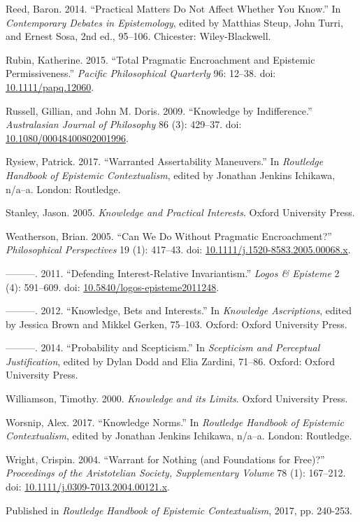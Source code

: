 \documentclass[
  11pt,
  letterpaper,
  DIV=11,
  numbers=noendperiod,
  twoside]{scrartcl}
\newlength{\cslhangindent}
\newenvironment{CSLReferences}[2] %
 {\begin{list}{}{%
  \setlength{\itemindent}{0pt}
  \setlength{\leftmargin}{0pt}
  \setlength{\parsep}{0pt}
  \ifodd #1
   \setlength{\leftmargin}{\cslhangindent}
   \setlength{\itemindent}{-1\cslhangindent}
  \fi
  \setlength{\itemsep}{#2\baselineskip}}}
 {\end{list}}
\begin{document}
\begin{CSLReferences}{1}{0}
Reed, Baron. 2014. {``Practical Matters Do Not Affect Whether You
Know.''} In \emph{Contemporary Debates in Epistemology}, edited by
Matthias Steup, John Turri, and Ernest Sosa, 2nd ed., 95--106.
Chicester: Wiley-Blackwell.

Rubin, Katherine. 2015. {``Total Pragmatic Encroachment and Epistemic
Permissiveness.''} \emph{Pacific Philosophical Quarterly} 96: 12--38.
doi: \href{https://doi.org/10.1111/papq.12060}{10.1111/papq.12060}.

Russell, Gillian, and John M. Doris. 2009. {``Knowledge by
Indifference.''} \emph{Australasian Journal of Philosophy} 86 (3):
429--37. doi:
\href{https://doi.org/10.1080/00048400802001996}{10.1080/00048400802001996}.

Rysiew, Patrick. 2017. {``Warranted Assertability Maneuvers.''} In
\emph{Routledge Handbook of Epistemic Contextualism}, edited by Jonathan
Jenkins Ichikawa, n/a--a. London: Routledge.

Stanley, Jason. 2005. \emph{{Knowledge and Practical Interests}}. Oxford
University Press.

Weatherson, Brian. 2005. {``{Can We Do Without Pragmatic
Encroachment?}''} \emph{Philosophical Perspectives} 19 (1): 417--43.
doi:
\href{https://doi.org/10.1111/j.1520-8583.2005.00068.x}{10.1111/j.1520-8583.2005.00068.x}.

---------. 2011. {``Defending Interest-Relative Invariantism.''}
\emph{Logos \& Episteme} 2 (4): 591--609. doi:
\href{https://doi.org/10.5840/logos-episteme2011248}{10.5840/logos-episteme2011248}.

---------. 2012. {``Knowledge, Bets and Interests.''} In \emph{Knowledge
Ascriptions}, edited by Jessica Brown and Mikkel Gerken, 75--103.
Oxford: Oxford University Press.

---------. 2014. {``Probability and Scepticism.''} In \emph{Scepticism
and Perceptual Justification}, edited by Dylan Dodd and Elia Zardini,
71--86. Oxford: Oxford University Press.

Williamson, Timothy. 2000. \emph{{Knowledge and its Limits}}. Oxford
University Press.

Worsnip, Alex. 2017. {``Knowledge Norms.''} In \emph{Routledge Handbook
of Epistemic Contextualism}, edited by Jonathan Jenkins Ichikawa,
n/a--a. London: Routledge.

Wright, Crispin. 2004. {``Warrant for Nothing (and Foundations for
Free)?''} \emph{Proceedings of the Aristotelian Society, Supplementary
Volume} 78 (1): 167--212. doi:
\href{https://doi.org/10.1111/j.0309-7013.2004.00121.x}{10.1111/j.0309-7013.2004.00121.x}.

\end{CSLReferences}



\noindent Published in\emph{
Routledge Handbook of Epistemic Contextualism}, 2017, pp. 240-253.
\end{document}
